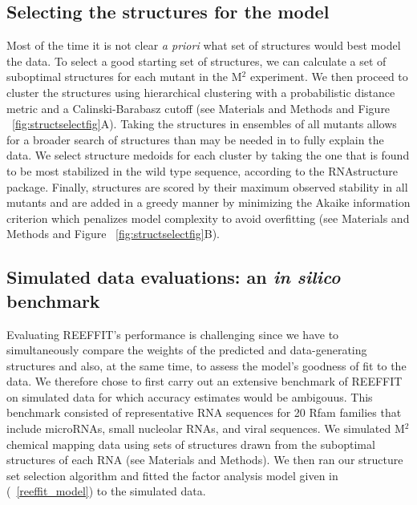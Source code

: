 \documentclass[12pt]{article}
\begin{document}
\subsection{Selecting the structures for the model}
Most of the time it is not clear \textit{a priori} what set of structures would best model the data. 
To select a good starting set of structures, we can calculate a set of suboptimal structures for each mutant in the M$^2$ experiment. 
We then proceed to cluster the structures using hierarchical clustering with a probabilistic distance metric and a Calinski-Barabasz cutoff (see Materials and Methods and Figure ~\ref{fig:structselectfig}A). 
Taking the structures in ensembles of all mutants allows for a broader search of structures than may be needed in to fully explain the data. 
We select structure medoids for each cluster by taking the one that is found to be most stabilized in the wild type sequence, according to the RNAstructure package. 
Finally, structures are scored by their maximum observed stability in all mutants and are added in a greedy manner by minimizing the Akaike information criterion which penalizes model complexity to avoid overfitting \cite{Akaike1987} (see Materials and Methods and Figure ~\ref{fig:structselectfig}B).


\subsection{Simulated data evaluations: an \textit{in silico} benchmark}
Evaluating REEFFIT's performance is challenging since we have to simultaneously compare the weights of the predicted and data-generating structures and also, at the same time, to assess the model's goodness of fit to the data. 
We therefore chose to first carry out an extensive benchmark of REEFFIT on simulated data for which accuracy estimates would be ambigouus. 
This benchmark consisted of representative RNA sequences for 20 Rfam families \cite{Gardner2011} that include microRNAs, small nucleolar RNAs, and viral sequences. 
We simulated M$^2$ chemical mapping data using sets of structures drawn from the suboptimal structures of each RNA (see Materials and Methods). 
We then ran our structure set selection algorithm and fitted the factor analysis model given in (~\ref{reeffit_model}) to the simulated data. 
\end{document}

